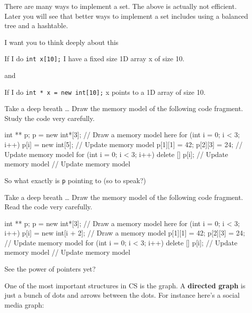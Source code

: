 There are many ways to implement a set. The above is actually not
efficient. Later you will see that better ways to implement a set
includes using a balanced tree and a hashtable.

\newpage{}

I want you to think deeply about this

If I do \verb!int x[10];! I have a fixed size 1D array x of size 10.

and

If I do \verb!int * x = new int[10];! x points to a 1D array of size
10.

\begin{ex}
Take a deep breath \ldots{} Draw the memory model of
the following code fragment. Study the code very carefully.

\begin{consolethree}[escapeinside=||]
int ** p;
p = new int*[3];
// Draw a memory model here
for (int i = 0; i < 3; i++)
{
    p[i] = new int[5];
    // Update memory model
}
p[1][1] = 42;
p[2][3] = 24;
// Update memory model
for (int i = 0; i < 3; i++)
{
    delete [] p[i];
    // Update memory model
}
// Update memory model
\end{consolethree}

So what exactly is \texttt{p} pointing to (so to speak?)
\end{ex}

\begin{ex}
Take a deep breath \ldots{} Draw the memory model of
the following code fragment. Read the code very carefully.

\begin{consolethree}[escapeinside=||]
int ** p;
p = new int*[3];
// Draw a memory model here
for (int i = 0; i < 3; i++)
{
    p[i] = new int[i + 2];
    // Draw a memory model
}
p[1][1] = 42;
p[2][3] = 24;
// Update memory model
for (int i = 0; i < 3; i++)
{
    delete [] p[i];
    // Update memory model
}
// Update memory model
\end{consolethree}

See the power of pointers yet?
\end{ex}

\newpage{}

One of the most important structures in CS is the graph. A
\textbf{directed graph} is just a bunch of dots and arrows between the
dots. For instance here's a social media graph:


